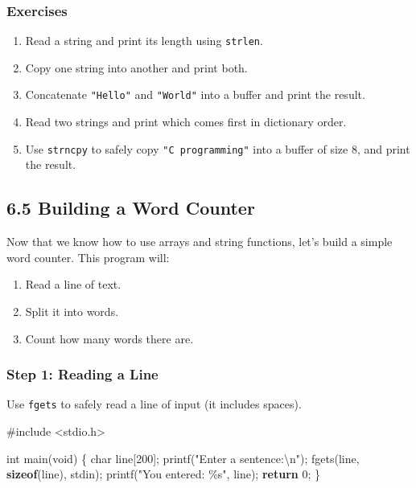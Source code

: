 \documentclass[
  letterpaper,
  DIV=11,
  numbers=noendperiod]{scrreprt}
\newenvironment{Shaded}{\begin{snugshade}}{\end{snugshade}}
\newcommand{\ControlFlowTok}[1]{\textcolor[rgb]{0.00,0.23,0.31}{\textbf{#1}}}
\newcommand{\DataTypeTok}[1]{\textcolor[rgb]{0.68,0.00,0.00}{#1}}
\newcommand{\DecValTok}[1]{\textcolor[rgb]{0.68,0.00,0.00}{#1}}
\newcommand{\ImportTok}[1]{\textcolor[rgb]{0.00,0.46,0.62}{#1}}
\newcommand{\KeywordTok}[1]{\textcolor[rgb]{0.00,0.23,0.31}{\textbf{#1}}}
\newcommand{\NormalTok}[1]{\textcolor[rgb]{0.00,0.23,0.31}{#1}}
\newcommand{\OperatorTok}[1]{\textcolor[rgb]{0.37,0.37,0.37}{#1}}
\newcommand{\PreprocessorTok}[1]{\textcolor[rgb]{0.68,0.00,0.00}{#1}}
\newcommand{\SpecialCharTok}[1]{\textcolor[rgb]{0.37,0.37,0.37}{#1}}
\newcommand{\StringTok}[1]{\textcolor[rgb]{0.13,0.47,0.30}{#1}}
\providecommand{\tightlist}{%
  \setlength{\itemsep}{0pt}\setlength{\parskip}{0pt}}
\begin{document}
\subsubsection{Exercises}\label{exercises-28}

\begin{enumerate}
\def\labelenumi{\arabic{enumi}.}
\tightlist
\item
  Read a string and print its length using \texttt{strlen}.
\item
  Copy one string into another and print both.
\item
  Concatenate \texttt{"Hello"} and \texttt{"World"} into a buffer and
  print the result.
\item
  Read two strings and print which comes first in dictionary order.
\item
  Use \texttt{strncpy} to safely copy \texttt{"C\ programming"} into a
  buffer of size 8, and print the result.
\end{enumerate}

\subsection{6.5 Building a Word Counter}\label{building-a-word-counter}

Now that we know how to use arrays and string functions, let's build a
simple word counter. This program will:

\begin{enumerate}
\def\labelenumi{\arabic{enumi}.}
\tightlist
\item
  Read a line of text.
\item
  Split it into words.
\item
  Count how many words there are.
\end{enumerate}

\subsubsection{Step 1: Reading a Line}\label{step-1-reading-a-line}

Use \texttt{fgets} to safely read a line of input (it includes spaces).

\begin{Shaded}
\begin{Highlighting}[]
\PreprocessorTok{\#include }\ImportTok{\textless{}stdio.h\textgreater{}}

\DataTypeTok{int}\NormalTok{ main}\OperatorTok{(}\DataTypeTok{void}\OperatorTok{)} \OperatorTok{\{}
    \DataTypeTok{char}\NormalTok{ line}\OperatorTok{[}\DecValTok{200}\OperatorTok{];}
\NormalTok{    printf}\OperatorTok{(}\StringTok{"Enter a sentence:}\SpecialCharTok{\textbackslash{}n}\StringTok{"}\OperatorTok{);}
\NormalTok{    fgets}\OperatorTok{(}\NormalTok{line}\OperatorTok{,} \KeywordTok{sizeof}\OperatorTok{(}\NormalTok{line}\OperatorTok{),}\NormalTok{ stdin}\OperatorTok{);}
\NormalTok{    printf}\OperatorTok{(}\StringTok{"You entered: }\SpecialCharTok{\%s}\StringTok{"}\OperatorTok{,}\NormalTok{ line}\OperatorTok{);}
    \ControlFlowTok{return} \DecValTok{0}\OperatorTok{;}
\OperatorTok{\}}
\end{Highlighting}
\end{Shaded}
\end{document}

